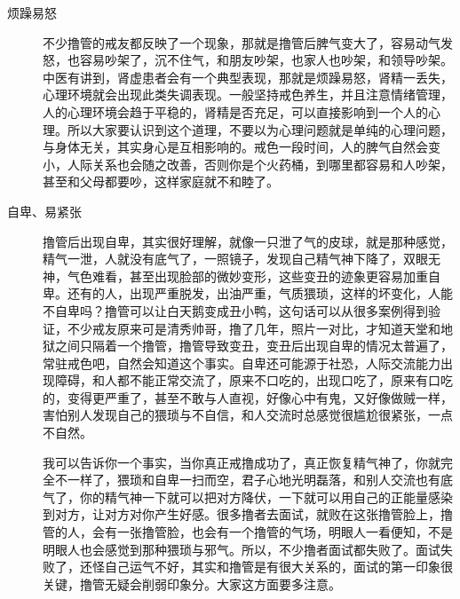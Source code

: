 \begin{description}
    \item[烦躁易怒] 不少撸管的戒友都反映了一个现象，那就是撸管后脾气变大了，容易动气发怒，也容易吵架了，沉不住气，和朋友吵架，也家人也吵架，和领导吵架。中医有讲到，肾虚患者会有一个典型表现，那就是烦躁易怒，肾精一丢失，心理环境就会出现此类失调表现。一般坚持戒色养生，并且注意情绪管理，人的心理环境会趋于平稳的，肾精是否充足，可以直接影响到一个人的心理。所以大家要认识到这个道理，不要以为心理问题就是单纯的心理问题，与身体无关，其实身心是互相影响的。戒色一段时间，人的脾气自然会变小，人际关系也会随之改善，否则你是个火药桶，到哪里都容易和人吵架，甚至和父母都要吵，这样家庭就不和睦了。
    \item[自卑、易紧张] 撸管后出现自卑，其实很好理解，就像一只泄了气的皮球，就是那种感觉，精气一泄，人就没有底气了，一照镜子，发现自己精气神下降了，双眼无神，气色难看，甚至出现脸部的微妙变形，这些变丑的迹象更容易加重自卑。还有的人，出现严重脱发，出油严重，气质猥琐，这样的坏变化，人能不自卑吗？撸管可以让白天鹅变成丑小鸭，这句话可以从很多案例得到验证，不少戒友原来可是清秀帅哥，撸了几年，照片一对比，才知道天堂和地狱之间只隔着一个撸管，撸管导致变丑，变丑后出现自卑的情况太普遍了，常驻戒色吧，自然会知道这个事实。自卑还可能源于社恐，人际交流能力出现障碍，和人都不能正常交流了，原来不口吃的，出现口吃了，原来有口吃的，变得更严重了，甚至不敢与人直视，好像心中有鬼，又好像做贼一样，害怕别人发现自己的猥琐与不自信，和人交流时总感觉很尴尬很紧张，一点不自然。

    我可以告诉你一个事实，当你真正戒撸成功了，真正恢复精气神了，你就完全不一样了，猥琐和自卑一扫而空，君子心地光明磊落，和别人交流也有底气了，你的精气神一下就可以把对方降伏，一下就可以用自己的正能量感染到对方，让对方对你产生好感。很多撸者去面试，就败在这张撸管脸上，撸管的人，会有一张撸管脸，也会有一个撸管的气场，明眼人一看便知，不是明眼人也会感觉到那种猥琐与邪气。所以，不少撸者面试都失败了。面试失败了，还怪自己运气不好，其实和撸管是有很大关系的，面试的第一印象很关键，撸管无疑会削弱印象分。大家这方面要多注意。


\end{description}
